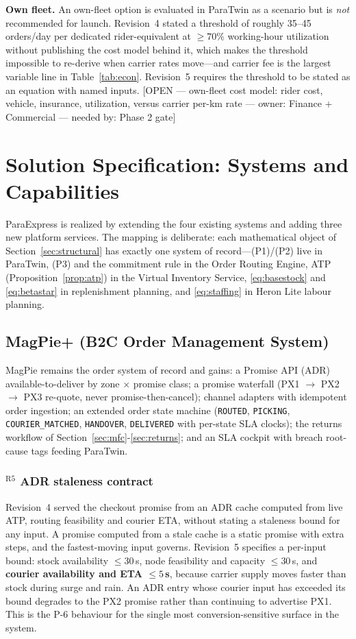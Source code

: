 \documentclass[10pt,twocolumn,letterpaper]{article}
\theoremstyle{definition}
\newcommand{\OPEN}[3]{{\color{openred}\footnotesize\textsf{[OPEN --- #1 --- owner: #2 --- needed by: #3]}}}
\begin{document}
\textbf{Own fleet.} An own-fleet option is evaluated in ParaTwin as a scenario but is \emph{not} recommended for launch. Revision~4 stated a threshold of roughly 35--45 orders/day per dedicated rider-equivalent at $\ge70\%$ working-hour utilization without publishing the cost model behind it, which makes the threshold impossible to re-derive when carrier rates move---and carrier fee is the largest variable line in Table~\ref{tab:econ}. Revision~5 requires the threshold to be stated as an equation with named inputs. \OPEN{own-fleet cost model: rider cost, vehicle, insurance, utilization, versus carrier per-km rate}{Finance + Commercial}{Phase 2 gate}

\section{Solution Specification: Systems and Capabilities}\label{sec:solution}

ParaExpress is realized by extending the four existing systems and adding three new platform services. The mapping is deliberate: each mathematical object of Section~\ref{sec:structural} has exactly one system of record---(P1)/(P2) live in ParaTwin, (P3) and the commitment rule in the Order Routing Engine, ATP (Proposition~\ref{prop:atp}) in the Virtual Inventory Service, \eqref{eq:basestock} and \eqref{eq:betastar} in replenishment planning, and \eqref{eq:staffing} in Heron Lite labour planning.

\subsection{MagPie+ (B2C Order Management System)}
MagPie remains the order system of record and gains: a Promise API (ADR) available-to-deliver by zone $\times$ promise class; a promise waterfall (PX1 $\to$ PX2 $\to$ PX3 re-quote, never promise-then-cancel); channel adapters with idempotent order ingestion; an extended order state machine (\texttt{ROUTED}, \texttt{PICKING}, \texttt{COURIER\_MATCHED}, \texttt{HANDOVER}, \texttt{DELIVERED} with per-state SLA clocks); the returns workflow of Section~\ref{sec:mfc}-\ref{sec:returns}; and an SLA cockpit with breach root-cause tags feeding ParaTwin.

\subsubsection*{$^{\mathrm{R5}}$ ADR staleness contract}
Revision~4 served the checkout promise from an ADR cache computed from live ATP, routing feasibility and courier ETA, without stating a staleness bound for any input. A promise computed from a stale cache is a static promise with extra steps, and the fastest-moving input governs. Revision~5 specifies a per-input bound: stock availability $\le30$\,s, node feasibility and capacity $\le30$\,s, and \textbf{courier availability and ETA $\le5$\,s}, because carrier supply moves faster than stock during surge and rain. An ADR entry whose courier input has exceeded its bound degrades to the PX2 promise rather than continuing to advertise PX1. This is the P-6 behaviour for the single most conversion-sensitive surface in the system.
\end{document}
